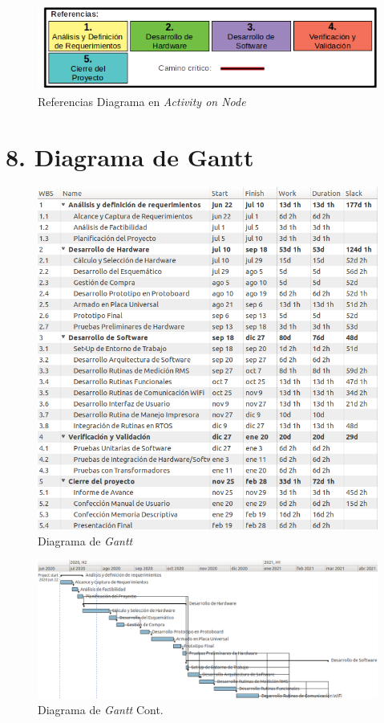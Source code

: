 \documentclass[11pt]{charter}
\begin{document}
\begin{figure}[htpb]
\centering 
\includegraphics[width=.8\textwidth]{./Figuras/AoN_ref.png}
\caption{Referencias Diagrama en \textit{Activity on Node}}
\label{fig:AoN_ref}
\end{figure}


\newpage
\section{8. Diagrama de Gantt}
\label{sec:gantt}

\begin{figure}[htpb]
\centering 
\includegraphics[width=.8\textwidth]{./Figuras/Gantt_1.png}
\caption{Diagrama de \textit{Gantt}}
\label{fig:Gantt_1}
\end{figure}


\begin{landscape}

\begin{figure}[htpb]
\centering 
\includegraphics[width=1.57\textwidth]{./Figuras/Gantt_2.png}
\caption{Diagrama de \textit{Gantt} Cont.}
\label{fig:Gantt_2}
\end{figure}

\end{landscape}
\end{document}

